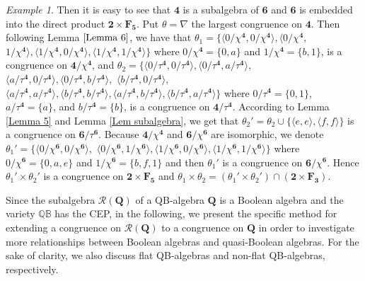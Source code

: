 \documentclass[12pt]{amsart}
\theoremstyle{definition}
\theoremstyle{remark}
\newtheorem{example}{Example}[section]
\numberwithin{equation}{section}
\begin{document}
\begin{example}
Then it is easy to see that $\mathbf{4}$ is a subalgebra of $\mathbf{6}$ and $\mathbf{6}$ is embedded into the direct product $\mathbf{2}\times\mathbf{F_{5}}$. Put $\theta=\nabla$ the largest congruence on $\mathbf{4}$. Then following Lemma $\ref{Lemma 6}$, we have that
$\theta_{1}=\{\langle 0/\chi^{\mathbf{4}},0/\chi^{\mathbf{4}}\rangle,\langle 0/\chi^{\mathbf{4}},$ $1/\chi^{\mathbf{4}}\rangle,\langle 1/\chi^{\mathbf{4}},0/\chi^{\mathbf{4}}\rangle,\langle 1/\chi^{\mathbf{4}},1/\chi^{\mathbf{4}}\rangle\}$ where $0/\chi^{\mathbf{4}}=\{0,a\}$ and $1/\chi^{\mathbf{4}}=\{b,1\}$, is a congruence on $\mathbf{4}/\chi^{\mathbf{4}}$, and $\theta_{2}=\{\langle 0/\tau^{\mathbf{4}},0/\tau^{\mathbf{4}}\rangle,\langle 0/\tau^{\mathbf{4}},a/\tau^{\mathbf{4}}\rangle,$ $\langle a/\tau^{\mathbf{4}},0/\tau^{\mathbf{4}}\rangle,\langle 0/\tau^{\mathbf{4}},b/\tau^{\mathbf{4}}\rangle,$ $\langle b/\tau^{\mathbf{4}},0/\tau^{\mathbf{4}}\rangle, $ $\langle a/\tau^{\mathbf{4}},a/\tau^{\mathbf{4}}\rangle,\langle b/\tau^{\mathbf{4}},b/\tau^{\mathbf{4}}\rangle,\langle a/\tau^{\mathbf{4}},b/\tau^{\mathbf{4}}\rangle,\langle b/\tau^{\mathbf{4}},a/\tau^{\mathbf{4}}\rangle\}$ where $0/\tau^{\mathbf{4}}=\{0,1\}$, $a/\tau^{\mathbf{4}}=\{a\}$, and $b/\tau^{\mathbf{4}}=\{b\}$,  is a congruence on $\mathbf{4}/\tau^{\mathbf{4}}$. According to Lemma \ref{Lemma 5} and Lemma \ref{Lem subalgebra}, we get that $\theta_{2}'=\theta_{2}\cup\{\langle e,e\rangle,\langle f,f\rangle\}$ is a congruence on $\mathbf{6}/\tau^{\mathbf{6}}$. Because $\mathbf{4}/\chi^{\mathbf{4}}$ and $\mathbf{6}/\chi^{\mathbf{6}}$ are isomorphic, we denote $\theta_{1}'=\{\langle 0/\chi^{\mathbf{6}},0/\chi^{\mathbf{6}}\rangle,$ $\langle 0/\chi^{\mathbf{6}},1/\chi^{\mathbf{6}}\rangle, \langle 1/\chi^{\mathbf{6}},0/\chi^{\mathbf{6}}\rangle,\langle 1/\chi^{\mathbf{6}},1/\chi^{\mathbf{6}}\rangle\}$ where $0/\chi^{\mathbf{6}}=\{0,a,e\}$ and $1/\chi^{\mathbf{6}}=\{b,f,1\}$ and then $\theta_{1}'$ is a congruence on $\mathbf{6}/\chi^{\mathbf{6}}$. Hence $\theta_{1}'\times \theta_{2}'$ is a congruence on $\mathbf{2}\times\mathbf{F_{5}}$ and $\theta_{1}\times \theta_{2}=(\theta_{1}'\times \theta_{2}')\cap (\mathbf{2}\times \mathbf{F_{3}})$.
\end{example}

Since the subalgebra $\mathscr{R}(\mathbf{Q})$ of a QB-algebra $\mathbf{Q}$ is a Boolean algebra and the variety $\mathbb{QB}$ has the CEP, in the following, we present the specific method for extending a congruence on  $\mathscr{R}(\mathbf{Q})$ to a congruence on $\mathbf{Q}$ in order to investigate more relationships between Boolean algebras and quasi-Boolean algebras. For the sake of clarity, we also discuss flat QB-algebras and non-flat QB-algebras, respectively.
\end{document}
